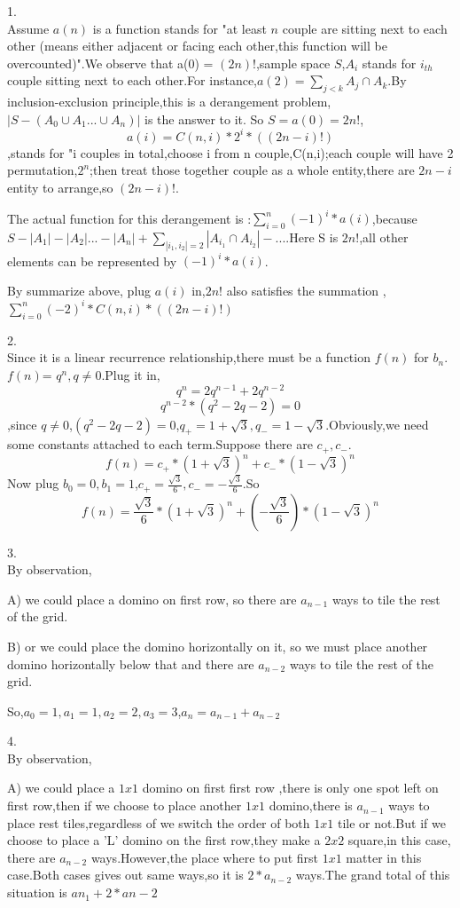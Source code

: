 \documentclass{article}
\begin{document}
1.\\Assume $a(n)$ is a function stands for "at least $n$ couple are sitting next to each other (means either adjacent or facing each other,this function will be overcounted)".We observe that a(0) = $(2n)!$,sample space $S$,$A_i$ stands for $i_{th}$ couple sitting next to each other.For instance,$a(2) = \sum_{j<k} A_j \cap A_k$.By inclusion-exclusion principle,this is a derangement problem,$|S-(A_0 \cup A_1 ... \cup A_n)|$ is the answer to it. So $S = a(0) =2n!$,$$a(i)=C(n,i)*2^i*{((2n-i)!)}$$,stands for "i couples in total,choose i from n couple,C(n,i);each couple will have 2 permutation,$2^n$;then treat those together couple as a whole entity,there are $2n-i$ entity to arrange,so $(2n-i)!.$

The actual function for this derangement is :$\sum_{i=0}^n(-1)^i*a(i)$,because $S-|A_1|-|A_2|...-|A_n|+\sum_{|{i_1},{i_2}|=2}|A_{i_1} \cap A_{i_2}|-...$.Here S is $2n!$,all other elements can be represented by $(-1)^i*a(i)$.

By summarize above, plug $a(i)$ in,${2n!}$ also satisfies the summation ,$\sum_{i=0}^n(-2)^i*C(n,i)*{((2n-i)!)}$

2.\\Since it is a linear recurrence relationship,there must be a function $f(n)$ for $b_n$.$f(n)$= $q^n,q\neq0$.Plug it in,$$q^n=2q^{n-1}+2q^{n-2}$$$$q^{n-2}*(q^2-2q-2)=0$$,since $q \neq0$,$(q^2-2q-2)=0$,$q_+ = 1+\sqrt{3},q_- = 1-\sqrt{3}$.Obviously,we need some constants attached to each term.Suppose there are $c_+,c_-$.$$f(n)=c_+*{(1+\sqrt{3})}^n+c_-*{(1-\sqrt{3})}^n$$
Now plug $b_0=0,b_1=1$,$c_+=\frac{\sqrt{3}}{6},c_-=-\frac{\sqrt{3}}{6}$.So $$f(n)=\frac{\sqrt{3}}{6}*{(1+\sqrt{3})}^n+(-\frac{\sqrt{3}}{6})*{(1-\sqrt{3})}^n$$

3.\\By observation,

A) we could place a domino on first row, so there are $a_{n−1}$ ways to tile the rest of the grid.

B) or we could place the domino horizontally on it, so we must place another domino horizontally below that and there are $a_{n−2}$ ways to tile the rest of the grid.

So,$a_0=1,a_1=1,a_2=2,a_3=3$,$a_n=a_{n-1}+a_{n-2}$

4.\\By observation,

A) we could place a $1x1$ domino on first first row ,there is only one spot left on first row,then if we choose to place another $1x1$ domino,there is $a_{n-1}$ ways to place rest tiles,regardless of we switch the order of both $1x1$ tile or not.But if we choose to place a 'L' domino on the first row,they make a $2x2$ square,in this case, there are  $a_{n-2}$ ways.However,the place where to put first $1x1$ matter in this case.Both cases gives out same ways,so it is $2*a_{n-2}$ ways.The grand total of this situation is $a{n_1}+2*a{n-2}$
\end{document}
